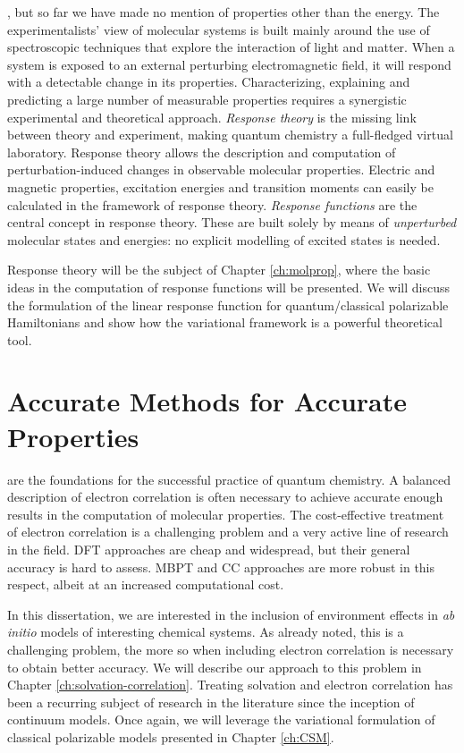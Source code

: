 , but so far we have made no mention of properties other than
the energy.
The experimentalists' view of molecular systems is built mainly around
the use of spectroscopic techniques that explore the interaction of
light and matter. When a system is exposed to an external perturbing
electromagnetic field, it will respond with a detectable change in its
properties.\autocite{Pedersen2012-il, Jaszunski2012-wy}
Characterizing, explaining and predicting a large number of measurable
properties requires a synergistic experimental and theoretical approach.
\emph{Response theory} is the missing link between theory and
experiment, making quantum chemistry a full-fledged virtual laboratory.
Response theory allows the description and computation of
perturbation-induced changes in observable molecular properties.
Electric and magnetic properties, excitation energies and transition
moments can easily be calculated in the framework of response theory.
\emph{Response functions} are the central concept in response theory.
These are built solely by means of \emph{unperturbed} molecular states and
energies: no explicit modelling of excited states is needed.

Response theory will be the subject of Chapter \ref{ch:molprop},
where the basic ideas in the computation of response functions will be
presented. We will discuss the formulation of the linear response
function for quantum/classical polarizable Hamiltonians and show how the
variational framework is a powerful theoretical tool.

\section*{Accurate Methods for Accurate Properties}

 are the foundations for the successful practice of quantum
chemistry.
A balanced description of electron correlation is often necessary
to achieve accurate enough results in the computation of molecular
properties.\autocite{Lee1995-pw, Helgaker2004-oz, Tajti2004-ye}
The cost-effective treatment of electron correlation is a challenging
problem and a very active line of research in the field.
\Acrlong*{DFT} approaches are cheap and widespread, but their general
accuracy is hard to assess. \Acrlong*{MBPT} and \acrlong*{CC} approaches
are more robust in this respect, albeit at an increased computational
cost.

In this dissertation, we are interested in the inclusion of
environment effects in \emph{ab initio} models of interesting chemical
systems. As already noted, this is a challenging problem, the more so
when including electron correlation is necessary to obtain better
accuracy.
We will describe our approach to this problem in Chapter
\ref{ch:solvation-correlation}. Treating solvation and electron
correlation has been a recurring subject of research in the literature
since the inception of continuum models. Once again, we will leverage
the variational formulation of classical polarizable models presented
in Chapter \ref{ch:CSM}.
